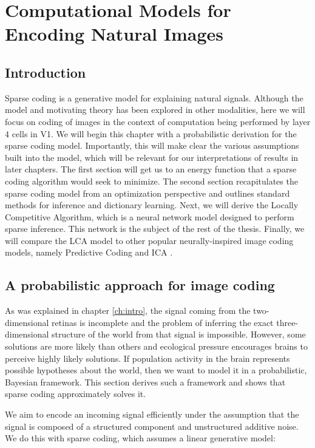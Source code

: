 \chapter{Computational Models for Encoding Natural Images}

\section{Introduction}
Sparse coding is a generative model for explaining natural signals. Although the model and motivating theory has been explored in other modalities, here we will focus on coding of images in the context of computation being performed by layer 4 cells in V1. We will begin this chapter with a probabilistic derivation for the sparse coding model. Importantly, this will make clear the various assumptions built into the model, which will be relevant for our interpretations of results in later chapters. The first section will get us to an energy function that a sparse coding algorithm would seek to minimize. The second section recapitulates the sparse coding model from an optimization perspective and outlines standard methods for inference and dictionary learning. Next, we will derive the Locally Competitive Algorithm, which is a neural network model designed to perform sparse inference. This network is the subject of the rest of the thesis. Finally, we will compare the LCA model to other popular neurally-inspired image coding models, namely Predictive Coding \parencite{rao1999predictive} and ICA \parencite{bell1997independent}.

\section{A probabilistic approach for image coding}
As was explained in chapter \ref{ch:intro}, the signal coming from the two-dimensional retinas is incomplete and the problem of inferring the exact three-dimensional structure of the world from that signal is impossible. However, some solutions are more likely than others and ecological pressure encourages brains to perceive highly likely solutions. If population activity in the brain represents possible hypotheses about the world, then we want to model it in a probabilistic, Bayesian framework. This section derives such a framework and shows that sparse coding approximately solves it.

We aim to encode an incoming signal efficiently under the assumption that the signal is composed of a structured component and unstructured additive noise. We do this with sparse coding, which assumes a linear generative model:

